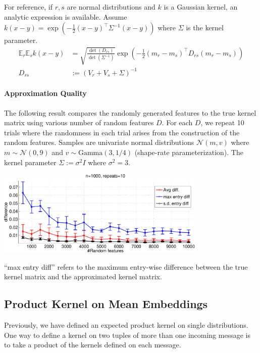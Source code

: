 \documentclass[english]{article}
\theoremstyle{plain}
\theoremstyle{plain}
\begin{document}
For reference, if $r, s$ are normal distributions and $k$
is a Gaussian kernel, an analytic expression is available. Assume
$k(x-y)=\exp\left(-\frac{1}{2}\left(x-y\right)^{\top}\Sigma^{-1}\left(x-y\right)\right)$
where $\Sigma$ is the kernel parameter.
\begin{align*}
\mathbb{E}_{r}\mathbb{E}_{s}k(x-y) & =\sqrt{\frac{\det(D_{rs})}{\det(\Sigma^{-1})}}\exp\left(-\frac{1}{2}\left(m_{r}-m_{s}\right)^{\top}D_{rs}\left(m_{r}-m_{s}\right)\right)\\
D_{rs} & :=\left(V_{r}+V_{s}+\Sigma\right)^{-1}
\end{align*}

\paragraph{Approximation Quality}

{} The following result compares the randomly generated features to
the true kernel matrix using various number of random features $D$. 
For each $D$, we repeat 10 trials where the randomness in each trial 
arises from the construction of the random features. 
Samples are univariate normal distributions $\mathcal{N}(m, v)$ where 
$m \sim \mathcal{N}(0, 9)$ and $v \sim \text{Gamma}(3, 1/4)$ (shape-rate 
parameterization). The kernel parameter $\Sigma:=\sigma^2 I$ where $\sigma^2=3$.

\includegraphics[width=10cm]{img/primal_egauss_sanity-crop}

``max entry diff''
refers to the maximum entry-wise difference between the true kernel
matrix and the approximated kernel matrix.

\subsection{Product Kernel on Mean Embeddings}
Previously, we have defined an expected product kernel on single distributions.
One way to define a kernel on two tuples of more than one incoming message is to take 
a product of the kernels defined on each message.
\end{document}
